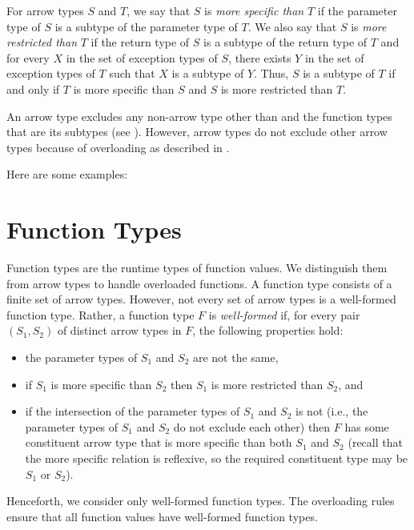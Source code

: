 For arrow types $S$ and $T$,
we say that $S$ is \emph{more specific than} $T$
if the parameter type of $S$ is a subtype of the parameter type of $T$.
We also say that $S$ is \emph{more restricted than} $T$
if the return type of $S$ is a subtype of the return type of $T$
and for every $X$ in the set of exception types of $S$,
there exists $Y$ in the set of exception types of $T$ such that
$X$ is a subtype of $Y$.
Thus, $S$ is a subtype of $T$ if and only if
$T$ is more specific than $S$ and $S$ is more restricted than $T$.

An arrow type excludes any non-arrow type other than 
and the function types that are its subtypes (see ).
However, arrow types do not exclude other arrow types because of
overloading as described in .

Here are some examples:


\section{Function Types}

Function types are the runtime types of function values.
We distinguish them from arrow types
to handle overloaded functions.
A function type consists of a finite set of arrow types.
However, not every set of arrow types is a well-formed function type.
Rather, a function type $F$ is \emph{well-formed} if,
for every pair $(S_1,S_2)$ of distinct arrow types in $F$,
the following properties hold:
\begin{itemize}

\item
the parameter types of $S_1$ and $S_2$ are not the same,

\item
if $S_1$ is more specific than $S_2$
then $S_1$ is more restricted than $S_2$, and

\item
if the intersection of the parameter types of $S_1$ and $S_2$
is not 
(i.e., the parameter types of $S_1$ and $S_2$ do not exclude each other)
then $F$ has some constituent arrow type
that is more specific than both $S_1$ and $S_2$
(recall that the more specific relation is reflexive,
so the required constituent type may be $S_1$ or $S_2$).

\end{itemize}

Henceforth, we consider only well-formed function types.
The overloading rules ensure that all function values
have well-formed function types.

